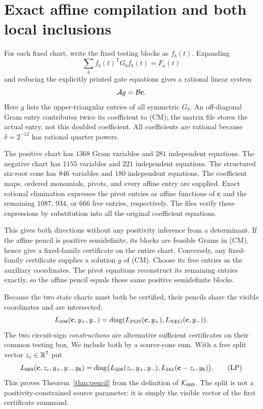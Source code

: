 \section{Exact affine compilation and both local inclusions}
\label{sec:matrices}
For each fixed chart, write the fixed testing blocks as $f_b(t)$.
Expanding
\[
 \sum_b f_b(t)^{\mathsf T}G_b f_b(t)=F_{\mathbf c}(t)
 \tag{CM}
\]
and reducing the explicitly printed gate equations gives a rational
linear system
\[
 {\cal A}g={\cal B}\mathbf c.
\]
Here $g$ lists the upper-triangular entries of all symmetric $G_b$.
An off-diagonal Gram entry contributes twice its coefficient to
(CM); the matrix file stores the actual entry, not this doubled
coefficient. All coefficients are rational because $\delta=2^{-12}$
has rational quarter powers.

The positive chart has $1368$ Gram variables and $281$ independent
equations. The negative chart has $1155$ variables and $221$
independent equations. The structured six-root cone has $846$
variables and $180$ independent equations. The coefficient maps,
ordered monomials, pivots, and every affine entry are supplied.
Exact rational elimination expresses the pivot entries as affine
functions of $\mathbf c$ and the remaining $1087$, $934$, or $666$
free entries, respectively. The files verify these expressions by
substitution into all the original coefficient equations.

This gives both directions without any positivity inference from a
determinant. If the affine pencil is positive semidefinite, its
blocks are feasible Grams in (CM), hence give a fixed-family
certificate on the entire chart. Conversely, any fixed-family
certificate supplies a solution $g$ of (CM). Choose its free entries
as the auxiliary coordinates. The pivot equations reconstruct its
remaining entries exactly, so the affine pencil equals those same
positive semidefinite blocks.

Because the two state charts must both be certified, their pencils
share the visible coordinates and are intersected:
\[
 L_{508}(\mathbf c,y_+,y_-)=
 \operatorname{diag}(L_{\rm POS}(\mathbf c,y_+),L_{\rm NEG}(\mathbf c,y_-)).
\]
The two circuit-sign \emph{constructions} are alternative sufficient
certificates on their common testing box. We include both by a
source-cone sum. With a free split vector $z_c\in\mathbb R^7$ put
\[
 L_{669}(\mathbf c,z_c,y_+,y_-,y_6)
   =\operatorname{diag}\bigl(L_{508}(z_c,y_+,y_-),
                       L_{161}(\mathbf c-z_c,y_6)\bigr).
 \tag{LP}
\]
This proves Theorem~\ref{thm:pencil} from the definition of
$\mathcal K_{669}$. The split is not a positivity-constrained source
parameter: it is simply the visible vector of the first certificate
summand.

